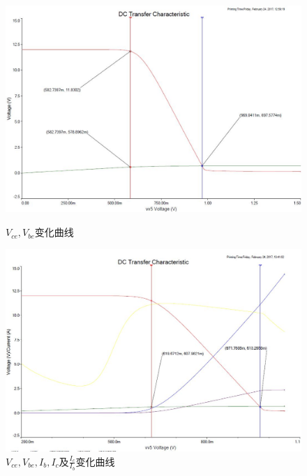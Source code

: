 \documentclass[UTF8,a4paper]{ctexart}
\begin{document}
\begin{figure}
\includegraphics[width=\textwidth]{cap/20.JPG}
\caption{$V_{ce},V_{be}$变化曲线}
\label{simple}
\includegraphics[width=\textwidth]{cap/14.JPG}
\caption{$V_{ce},V_{be},I_b,I_c$及$\frac{I_c}{I_b}$变化曲线}
\label{complex}
\end{figure}
\end{document}
